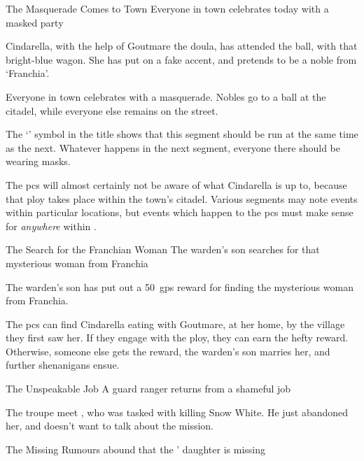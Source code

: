 \begin{multicols}{2}
{\squash The Masquerade Comes to Town}%
{Everyone in town celebrates today with a masked party}%

\begin{exampletext}
  Cindarella, with the help of Goutmare the \gls{doula}, has attended the ball, with that bright-blue wagon.
  She has put on a fake accent, and pretends to be a noble from `Franchia'.
\end{exampletext}

Everyone in town celebrates with a masquerade.
Nobles go to a ball at the citadel, while everyone else remains on the street.

The `\squash' symbol in the title shows that this \gls{segment} should be run at the same time as the next.
Whatever happens in the next \gls{segment}, everyone there should be wearing masks.

The \glspl{pc} will almost certainly not be aware of what Cindarella is up to, because that ploy takes place within the town's citadel.
Various \glspl{segment} may note events within particular locations, but events which happen to the \glspl{pc} must make sense for \textit{anywhere} within .

{The Search for the Franchian Woman}%
{The \gls{warden}'s son searches for that mysterious woman from Franchia}%

\begin{exampletext}
  The \gls{warden}'s son has put out a 50~\glspl{gp} reward for finding the mysterious woman from Franchia.
\end{exampletext}

The \glspl{pc} can find Cindarella eating with Goutmare, at her home, by the \gls{village} they first saw her.
If they engage with the ploy, they can earn the hefty reward.
Otherwise, someone else gets the reward, the \gls{warden}'s son marries her, and further shenanigans ensue.


{The Unspeakable Job}%
{A \gls{guard} \gls{ranger} returns from a shameful job}%

The troupe meet , who was tasked with killing Snow White.
He just abandoned her, and doesn't want to talk about the mission.


{The Missing }%
{Rumours abound that the ' daughter is missing}%


\end{multicols}
